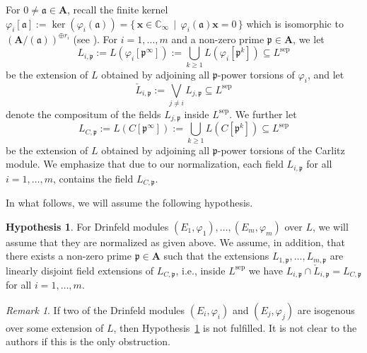 \documentclass[10pt,a4paper]{amsart}
\theoremstyle{plain} %
\theoremstyle{definition}
\newtheorem{Hypothesis}[Theorem]{Hypothesis}
\theoremstyle{remark}
\newtheorem{Remark}[Theorem]{Remark}
\newcommand{\CC}{\mathbb{C}}
\newcommand{\fp}{\mathfrak{p}}  %
\newcommand{\bA}{\mathbf{A}}
\newcommand{\sep}{\mathrm{sep}}
\numberwithin{equation}{subsection}
\begin{document}
For $0\neq \mathfrak{a} \in \bA$, recall the finite kernel 
$\varphi_i[\mathfrak{a}]:= \ker(\varphi_{i}(\mathfrak{a})) = \{ \,\boldsymbol{x} \in \CC_\infty \, \mid \, \varphi_i(\mathfrak{a})\boldsymbol{x}=0\,\}$ which is isomorphic to $(\bA/(\mathfrak{a}))^{\oplus r_i}$ (see \cite[Thm.~7.2.1]{dt:ffa}).
For $i=1,\ldots, m$ and a non-zero prime $\fp\in \bA$, we let
\[   L_{i,\fp} := L(\varphi_i[\fp^\infty]):= \bigcup_{k\geq 1} L(\varphi_i[\fp^k]) \subseteq L^{\sep}\]
be the extension of $L$ obtained by adjoining all $\fp$-power torsions of $\varphi_i$, and let 
\[  \check{L}_{i,\fp}:= \bigvee_{j\ne i} L_{j,\fp} \subseteq L^{\sep}\]
denote the compositum of the fields $L_{j,\fp}$ inside $L^{\sep}$. We further let
\[ L_{C,\fp}:= L(C[\fp^\infty]):=\bigcup_{k\geq 1} L(C[\fp^k]) \subseteq L^{\sep}\]
be the extension of $L$ obtained by adjoining all  $\fp$-power torsions of the Carlitz module. We emphasize that due to our normalization, each field $L_{i,\fp}$ for all $i=1, \dots, m$, contains the field $L_{C,\fp}$.

In what follows, we will assume the following hypothesis.

\begin{Hypothesis}\label{hypo:severalDMs}
For Drinfeld modules $(E_1,\varphi_1), \ldots, (E_m,\varphi_m)$ over $L$, we will assume that they are normalized as given above. We assume, in addition, that there exists a non-zero prime $\fp \in \bA$ such that the extensions $L_{1,\fp},\ldots, L_{m,\fp}$ are linearly disjoint field extensions of $L_{C,\fp}$, i.e., inside $L^\sep$ we have $L_{i,\fp}\cap \check{L}_{i,\fp}=L_{C,\fp}$ for all $i=1,\ldots, m$.
\end{Hypothesis}

\begin{Remark}
If two of the Drinfeld modules $(E_i,\varphi_i)$ and $(E_j,\varphi_j)$ are isogenous over some extension of $L$, then Hypothesis~\ref{hypo:severalDMs} is not fulfilled. It is not clear to the authors if this is the only obstruction. 
\end{Remark}
\end{document}
